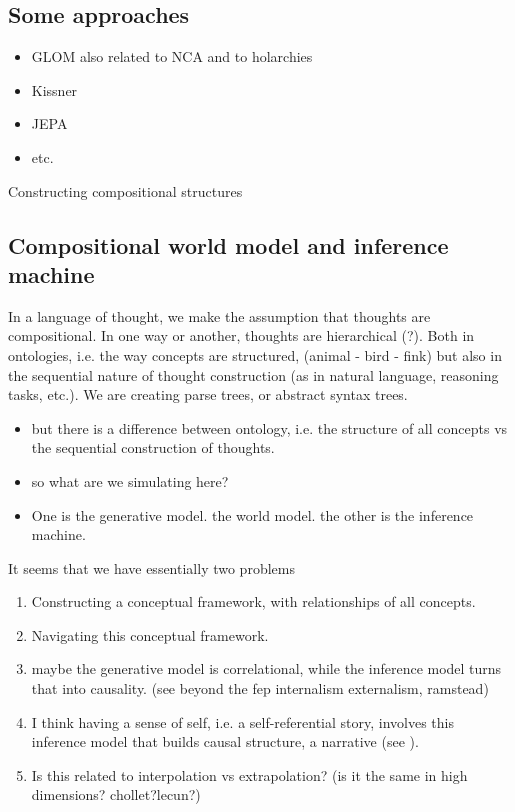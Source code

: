\subsection{Some approaches}

\begin{itemize}
    \item GLOM also related to NCA and to holarchies
    \item Kissner
    \item JEPA
    \item etc. 
\end{itemize}




Constructing compositional structures

\subsection{Compositional world model and inference machine}

In a language of thought, we make the assumption that thoughts are compositional. In one way or another, thoughts are hierarchical (?).
Both in ontologies, i.e. the way concepts are structured, (animal - bird - fink) but also in the sequential nature of thought construction (as in natural language, reasoning tasks, etc.). We are creating parse trees, or abstract syntax trees. 

\begin{itemize}
    \item but there is a difference between ontology, i.e. the structure of all concepts vs the sequential construction of thoughts.
    \item so what are we simulating here?
    \item One is the generative model. the world model. the other is the inference machine. 
\end{itemize}

It seems that we have essentially two problems 
\begin{enumerate}
    \item Constructing a conceptual framework, with relationships of all concepts.
    \item Navigating this conceptual framework. 
    \item maybe the generative model is correlational, while the inference model turns that into causality. (see beyond the fep internalism externalism, ramstead)
    \item I think having a sense of self, i.e. a self-referential story, involves this inference model that builds causal structure, a narrative (see \cite{bouizegarene_narrative_2020}).
    \item Is this related to interpolation vs extrapolation? (is it the same in high dimensions? chollet?lecun?)
\end{enumerate}

